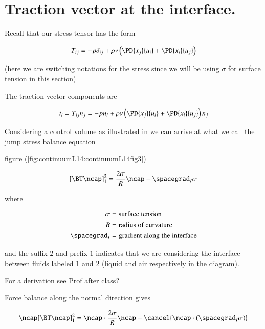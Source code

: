 \section{Traction vector at the interface.}

Recall that our stress tensor has the form

\begin{equation}\label{eqn:continuumL14:90}
T_{ij} = 
- p \delta_{ij} + \rho \nu \left( 
\PD{x_j}{u_i}
+\PD{x_i}{u_j}
\right)
\end{equation}

(here we are switching notations for the stress since we will be using $\sigma$ for surface tension in this section)

The traction vector components are

\begin{equation}\label{eqn:continuumL14:110}
t_i = T_{ij} n_j =
- p n_i + \rho \nu \left( 
\PD{x_j}{u_i}
+\PD{x_i}{u_j}
\right) n_j
\end{equation}

Considering a control volume as illustrated in we can arrive at what we call the jump stress balance equation

figure (\ref{fig:continuumL14:continuumL14fig3})

\begin{equation}\label{eqn:continuumL14:130}
[\BT \ncap]^2_1 = \frac{2 \sigma}{R} \ncap - \spacegrad_I \sigma
\end{equation}

where

\begin{align}\label{eqn:continuumL14:150}
\sigma &= \text{surface tension} \\
R &= \text{radius of curvature} \\
\spacegrad_I &= \text{gradient along the interface}
\end{align}

and the suffix $2$ and prefix $1$ indicates that we are considering the interface between fluids labeled $1$ and $2$ (liquid and air respectively in the diagram).

For a derivation see Prof after class?

Force balance along the normal direction gives

\begin{equation}\label{eqn:continuumL14:170}
\ncap [\BT \ncap]^2_1 = \ncap \cdot \frac{2 \sigma}{R} \ncap - \cancel{\ncap \cdot (\spacegrad_I \sigma)}
\end{equation}

